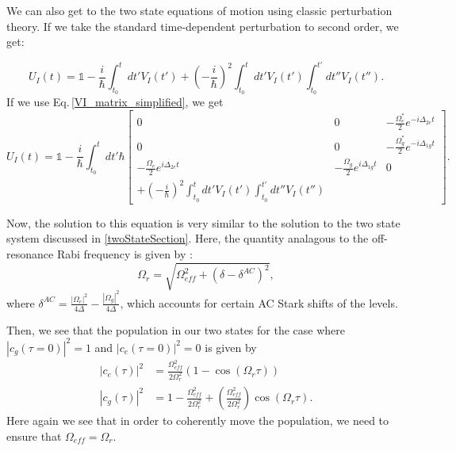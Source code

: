 We can also get to the two state equations of motion using classic perturbation theory. If we take the standard time-dependent perturbation to second order, we get:

\begin{equation}
U_I(t)=\mathds{1}-\frac{i}{\hbar}\int_{t_0}^t dt' V_I(t') + \left(-\frac{i}{\hbar}\right)^2 \int_{t_0}^t dt' V_I(t')\int_{t_0}^{t'}dt'' V_I(t'').
\end{equation}
If we use Eq.\,\eqref{VI_matrix_simplified}, we get 
\begin{equation}
U_I(t)=\mathds{1}-\frac{i}{\hbar}\int_{t_0}^t dt'  \hbar
\begin{bmatrix}
0 & 0 & -\frac{\Omega_e^*}{2}e^{-i\Delta_{2e}t} \\
0 & 0 & -\frac{\Omega_g^*}{2}e^{-i\Delta_{1g}t}\\
-\frac{\Omega_e}{2}e^{i\Delta_{2e}t} & -\frac{\Omega_{g}}{2}e^{i\Delta_{1g}t} & 0 \\
+ \left(-\frac{i}{\hbar}\right)^2 \int_{t_0}^t dt' V_I(t')\int_{t_0}^{t'}dt'' V_I(t'')
\end{bmatrix}.
\end{equation}

Now, the solution to this equation is very similar to the solution to the two state system discussed in \ref{twoStateSection}. Here, the quantity analagous to the off-resonance Rabi frequency is given by \cite{Young1997363}: 
\begin{equation}
\Omega_\mathit{r}=\sqrt{\Omega_\mathit{eff}^2+(\delta-\delta^{AC})^2},
\end{equation}
where $\delta^{AC}= \frac{|\Omega_e|^2}{4\Delta}-\frac{|\Omega_g|^2}{4\Delta}$, which accounts for certain AC Stark shifts of the levels. 

Then, we see that the population in our two states for the case where $|c_g(\tau=0)|^2=1$ and $|c_e(\tau=0)|^2=0$ is given by 
\begin{align}
|c_e(\tau)|^2&
=\frac{\Omega_{\mathit{eff}}^2}{2\Omega_r^2}(1-\cos(\Omega_r\tau))\\
|c_g(\tau)|^2&=
1-\frac{\Omega_{\mathit{eff}}^2}{2\Omega_r^2} + \left(\frac{\Omega_{\mathit{eff}}^2}{2\Omega_r^2}\right)\cos(\Omega_r \tau).
\end{align}
Here again we see that in order to coherently move the population, we need to ensure that $\Omega_{\mathit{eff}}=\Omega_r$.


